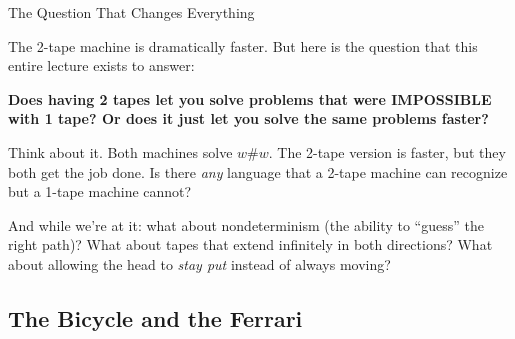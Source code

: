 \begin{conceptbox}{The Question That Changes Everything}

The 2-tape machine is dramatically faster. But here is the question that this entire lecture exists to answer:

\textbf{Does having 2 tapes let you solve problems that were IMPOSSIBLE with 1 tape? Or does it just let you solve the same problems faster?}

Think about it. Both machines solve $w\#w$. The 2-tape version is faster, but they both get the job done. Is there \textit{any} language that a 2-tape machine can recognize but a 1-tape machine cannot?

And while we're at it: what about nondeterminism (the ability to ``guess'' the right path)? What about tapes that extend infinitely in both directions? What about allowing the head to \textit{stay put} instead of always moving?

\end{conceptbox}

\subsection{The Bicycle and the Ferrari}
\label{subsec:analogy}


